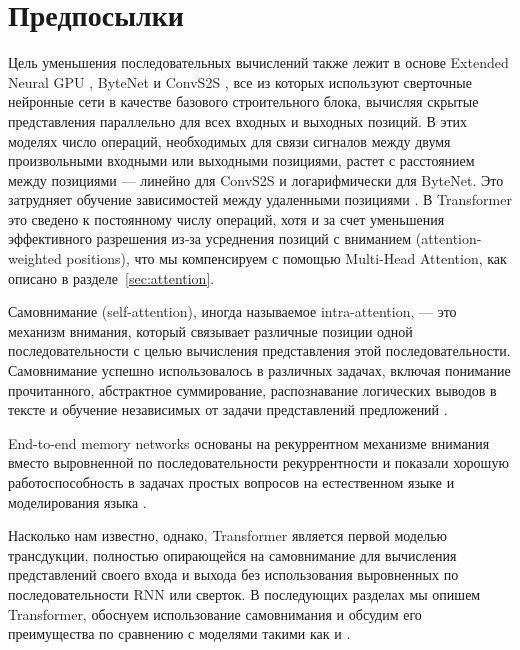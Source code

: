 \documentclass{article}
\begin{document}
\section{Предпосылки}

Цель уменьшения последовательных вычислений также лежит в основе Extended Neural GPU \citep{extendedngpu}, ByteNet \citep{NalBytenet2017} и ConvS2S \citep{JonasFaceNet2017}, все из которых используют сверточные нейронные сети в качестве базового строительного блока, вычисляя скрытые представления параллельно для всех входных и выходных позиций. В этих моделях число операций, необходимых для связи сигналов между двумя произвольными входными или выходными позициями, растет с расстоянием между позициями — линейно для ConvS2S и логарифмически для ByteNet. Это затрудняет обучение зависимостей между удаленными позициями \citep{hochreiter2001gradient}. В Transformer это сведено к постоянному числу операций, хотя и за счет уменьшения эффективного разрешения из‑за усреднения позиций с вниманием (attention-weighted positions), что мы компенсируем с помощью Multi-Head Attention, как описано в разделе~\ref{sec:attention}. 

Самовнимание (self-attention), иногда называемое intra-attention, — это механизм внимания, который связывает различные позиции одной последовательности с целью вычисления представления этой последовательности. Самовнимание успешно использовалось в различных задачах, включая понимание прочитанного, абстрактное суммирование, распознавание логических выводов в тексте и обучение независимых от задачи представлений предложений \citep{cheng2016long, decomposableAttnModel, paulus2017deep, lin2017structured}.

End-to-end memory networks основаны на рекуррентном механизме внимания вместо выровненной по последовательности рекуррентности и показали хорошую работоспособность в задачах простых вопросов на естественном языке и моделирования языка \citep{sukhbaatar2015}.

Насколько нам известно, однако, Transformer является первой моделью трансдукции, полностью опирающейся на самовнимание для вычисления представлений своего входа и выхода без использования выровненных по последовательности RNN или сверток.
В последующих разделах мы опишем Transformer, обоснуем использование самовнимания и обсудим его преимущества по сравнению с моделями такими как \citep{neural_gpu, NalBytenet2017} и \citep{JonasFaceNet2017}.

\end{document}
